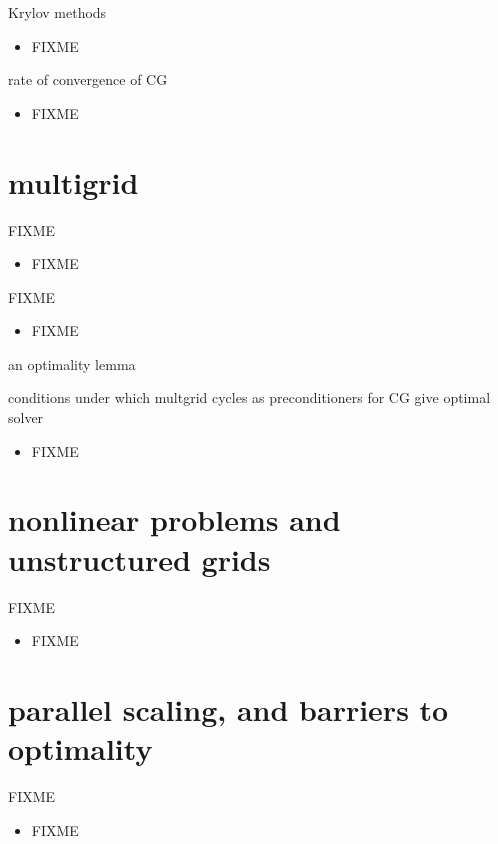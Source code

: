 \documentclass[hide notes,intlimits,usenames,dvipsnames]{beamer}
\begin{document}
\begin{frame}{Krylov methods}
\begin{itemize}
\item FIXME
\end{itemize}
\end{frame}

\begin{frame}{rate of convergence of CG}
\begin{itemize}
\item FIXME
\end{itemize}
\end{frame}


\section{multigrid}

\begin{frame}{FIXME}
\begin{itemize}
\item FIXME
\end{itemize}
\end{frame}

\begin{frame}{FIXME}
\begin{itemize}
\item FIXME
\end{itemize}
\end{frame}

\begin{frame}{an optimality lemma}

conditions under which multgrid cycles as preconditioners for CG give optimal solver
\begin{itemize}
\item FIXME
\end{itemize}
\end{frame}


\section{nonlinear problems and unstructured grids}

\begin{frame}{FIXME}
\begin{itemize}
\item FIXME
\end{itemize}
\end{frame}



\section{parallel scaling, and barriers to optimality}

\begin{frame}{FIXME}
\begin{itemize}
\item FIXME
\end{itemize}
\end{frame}
\end{document}
